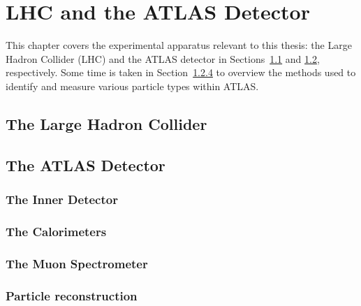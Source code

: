 \chapter[LHC and the ATLAS Detector][LHC and the ATLAS Detector]{LHC and the ATLAS Detector}
\label{ch:detector}
This chapter covers the experimental apparatus relevant to this thesis: the Large Hadron Collider (LHC) and the ATLAS detector in Sections~\ref{sec:lhc} and \ref{sec:atlas}, respectively.
Some time is taken in Section~\ref{sec:reconstruction} to overview the methods used to identify and measure various particle types within ATLAS.

\section{The Large Hadron Collider}\label{sec:lhc}


\section{The ATLAS Detector}\label{sec:atlas}


\subsection{The Inner Detector}\label{sec:id}


\subsection{The Calorimeters}\label{sec:calorimeters}


\subsection{The Muon Spectrometer}\label{sec:muon_spectrometer}


\subsection{Particle reconstruction}\label{sec:reconstruction}

